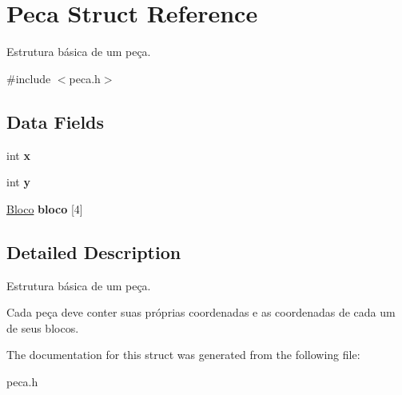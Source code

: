 \hypertarget{structPeca}{\section{Peca Struct Reference}
\label{structPeca}
}


Estrutura básica de um peça.  




{\ttfamily \#include $<$peca.\-h$>$}

\subsection*{Data Fields}
\begin{DoxyCompactItemize}
\item 
\hypertarget{structPeca_ade6a61203a13e92167ff809e10d16a28}{int {\bfseries x}}\label{structPeca_ade6a61203a13e92167ff809e10d16a28}

\item 
\hypertarget{structPeca_a95a5a63fdb2a273076fb73dc31c6fb87}{int {\bfseries y}}\label{structPeca_a95a5a63fdb2a273076fb73dc31c6fb87}

\item 
\hypertarget{structPeca_a655a23179cc71638a93dfad98682c045}{\hyperlink{structBloco}{Bloco} {\bfseries bloco} \mbox{[}4\mbox{]}}\label{structPeca_a655a23179cc71638a93dfad98682c045}

\end{DoxyCompactItemize}


\subsection{Detailed Description}
Estrutura básica de um peça. 

Cada peça deve conter suas próprias coordenadas e as coordenadas de cada um de seus blocos. 

The documentation for this struct was generated from the following file\-:\begin{DoxyCompactItemize}
\item 
peca.\-h\end{DoxyCompactItemize}
